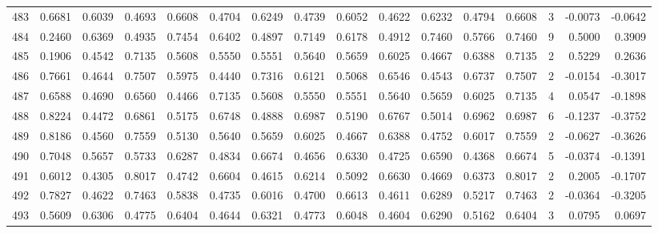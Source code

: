 \begin{tabular}{lrrrrrrrrrrrrrrr}
483 &      0.6681 &  0.6039 &  0.4693 &  0.6608 &  0.4704 &  0.6249 &  0.4739 &  0.6052 &  0.4622 &  0.6232 &   0.4794 &     0.6608 &      3 &                   -0.0073 &                    -0.0642 \\
484 &      0.2460 &  0.6369 &  0.4935 &  0.7454 &  0.6402 &  0.4897 &  0.7149 &  0.6178 &  0.4912 &  0.7460 &   0.5766 &     0.7460 &      9 &                    0.5000 &                     0.3909 \\
485 &      0.1906 &  0.4542 &  0.7135 &  0.5608 &  0.5550 &  0.5551 &  0.5640 &  0.5659 &  0.6025 &  0.4667 &   0.6388 &     0.7135 &      2 &                    0.5229 &                     0.2636 \\
486 &      0.7661 &  0.4644 &  0.7507 &  0.5975 &  0.4440 &  0.7316 &  0.6121 &  0.5068 &  0.6546 &  0.4543 &   0.6737 &     0.7507 &      2 &                   -0.0154 &                    -0.3017 \\
487 &      0.6588 &  0.4690 &  0.6560 &  0.4466 &  0.7135 &  0.5608 &  0.5550 &  0.5551 &  0.5640 &  0.5659 &   0.6025 &     0.7135 &      4 &                    0.0547 &                    -0.1898 \\
488 &      0.8224 &  0.4472 &  0.6861 &  0.5175 &  0.6748 &  0.4888 &  0.6987 &  0.5190 &  0.6767 &  0.5014 &   0.6962 &     0.6987 &      6 &                   -0.1237 &                    -0.3752 \\
489 &      0.8186 &  0.4560 &  0.7559 &  0.5130 &  0.5640 &  0.5659 &  0.6025 &  0.4667 &  0.6388 &  0.4752 &   0.6017 &     0.7559 &      2 &                   -0.0627 &                    -0.3626 \\
490 &      0.7048 &  0.5657 &  0.5733 &  0.6287 &  0.4834 &  0.6674 &  0.4656 &  0.6330 &  0.4725 &  0.6590 &   0.4368 &     0.6674 &      5 &                   -0.0374 &                    -0.1391 \\
491 &      0.6012 &  0.4305 &  0.8017 &  0.4742 &  0.6604 &  0.4615 &  0.6214 &  0.5092 &  0.6630 &  0.4669 &   0.6373 &     0.8017 &      2 &                    0.2005 &                    -0.1707 \\
492 &      0.7827 &  0.4622 &  0.7463 &  0.5838 &  0.4735 &  0.6016 &  0.4700 &  0.6613 &  0.4611 &  0.6289 &   0.5217 &     0.7463 &      2 &                   -0.0364 &                    -0.3205 \\
493 &      0.5609 &  0.6306 &  0.4775 &  0.6404 &  0.4644 &  0.6321 &  0.4773 &  0.6048 &  0.4604 &  0.6290 &   0.5162 &     0.6404 &      3 &                    0.0795 &                     0.0697 \\

\end{tabular}
